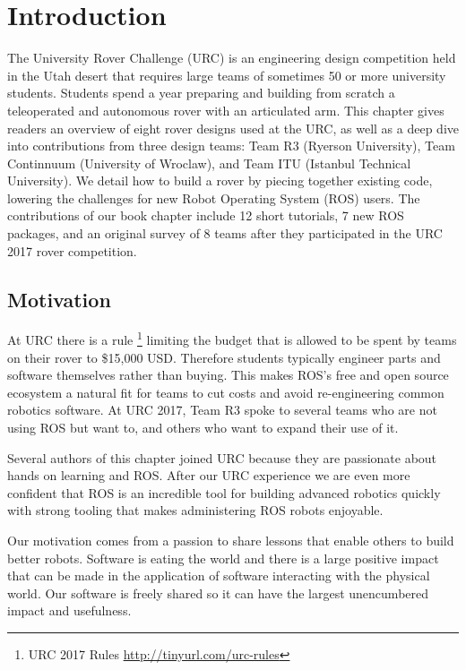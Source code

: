 \documentclass[runningheads,a4paper]{llncs}
\begin{document}
\section{Introduction}
The University Rover Challenge (URC) is an engineering design competition held in the Utah desert that requires large teams of sometimes 50 or more university students. Students spend a year preparing and building from scratch a teleoperated and autonomous rover with an articulated arm. This chapter gives readers an overview of eight rover designs used at the URC, as well as a deep dive into contributions from three design teams: Team R3 (Ryerson University), Team Continnuum (University of Wroclaw), and Team ITU (Istanbul Technical University). We detail how to build a rover by piecing together existing code, lowering the challenges for new Robot Operating System (ROS)\cite{288} users. The contributions of our book chapter include 12 short tutorials, 7 new ROS packages, and an original survey of 8 teams after they participated in the URC 2017 rover competition.

\subsection{Motivation}
At URC there is a rule \footnote{URC 2017 Rules \url{http://tinyurl.com/urc-rules}} limiting the budget that is allowed to be spent by teams on their rover to \$15,000 USD. Therefore students typically engineer parts and software themselves rather than buying. This makes ROS's free and open source ecosystem a natural fit for teams to cut costs and avoid re-engineering common robotics software. At URC 2017, Team R3 spoke to several teams who are not using ROS but want to, and others who want to expand their use of it. 

Several authors of this chapter joined URC because they are passionate about hands on learning and ROS. After our URC experience we are even more confident that ROS is an incredible tool for building advanced robotics quickly with strong tooling that makes administering ROS robots enjoyable.

Our motivation comes from a passion to share lessons that enable others to build better robots. Software is eating the world and there is a large positive impact that can be made in the application of software interacting with the physical world. Our software is freely shared so it can have the largest unencumbered impact and usefulness.
\end{document}

